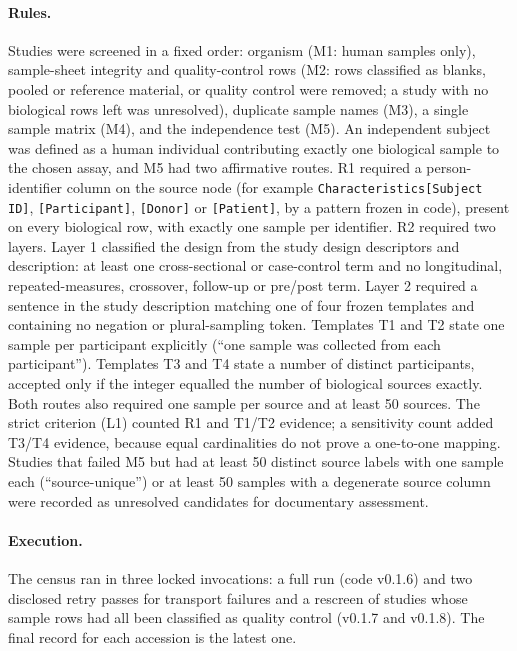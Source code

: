 \documentclass[sn-basic]{sn-jnl}
\begin{document}
\paragraph{Rules.} Studies were screened in a fixed order: organism (M1: human samples only), sample-sheet integrity
and quality-control rows (M2: rows classified as blanks, pooled or reference material, or quality control were
removed; a study with no biological rows left was unresolved), duplicate sample names (M3), a single sample matrix
(M4), and the independence test (M5). An independent subject was defined as a human individual contributing exactly
one biological sample to the chosen assay, and M5 had two affirmative routes. R1 required a person-identifier column
on the source node (for example \texttt{Characteristics[Subject ID]}, \texttt{[Participant]}, \texttt{[Donor]} or
\texttt{[Patient]}, by a pattern frozen in code), present on every biological row, with exactly one sample per
identifier. R2 required two layers. Layer 1 classified the design from the study design descriptors and description:
at least one cross-sectional or case-control term and no longitudinal, repeated-measures, crossover, follow-up or
pre/post term. Layer 2 required a sentence in the study description matching one of four frozen templates and
containing no negation or plural-sampling token. Templates T1 and T2 state one sample per participant explicitly
(``one sample was collected from each participant''). Templates T3 and T4 state a number of distinct participants,
accepted only if the integer equalled the number of biological sources exactly. Both routes also required one sample
per source and at least 50 sources. The strict criterion (L1) counted R1 and T1/T2 evidence; a sensitivity count
added T3/T4 evidence, because equal cardinalities do not prove a one-to-one mapping. Studies that failed M5 but had
at least 50 distinct source labels with one sample each (``source-unique'') or at least 50 samples with a degenerate
source column were recorded as unresolved candidates for documentary assessment.

\paragraph{Execution.} The census ran in three locked invocations: a full run (code v0.1.6) and two disclosed retry
passes for transport failures and a rescreen of studies whose sample rows had all been classified as quality control
(v0.1.7 and v0.1.8). The final record for each accession is the latest one.
\end{document}
